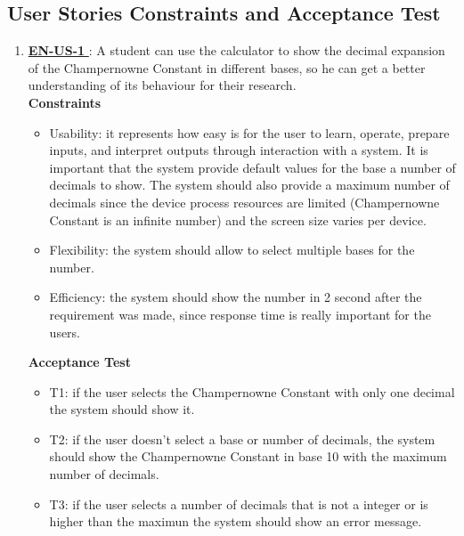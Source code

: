 \documentclass{report}
\begin{document}
\subsection{User Stories Constraints and Acceptance Test} 
\begin{enumerate}
    \item \underline{\textbf{EN-US-1 }}: A student can use the calculator to show the decimal expansion of the Champernowne Constant in different bases, so he can get a better understanding of its behaviour for their research. \\ \newline
\textbf{Constraints}
\begin{itemize}
    \item Usability: it represents how easy is for the user to learn, operate, prepare inputs, and interpret outputs through interaction with a system. It is important that the system provide default values for the base a number of decimals to show. The system should also provide a maximum number of decimals since the device process resources are limited (Champernowne Constant is an infinite number) and the screen size varies per device. 
    \item Flexibility: the system should allow to select multiple bases for the number. 
    \item Efficiency: the system should show the number in 2 second after the requirement was made, since response time is really important for the users. \\ \newline
\end{itemize}

\textbf{Acceptance Test}
\begin{itemize}
    \item T1: if the user selects the Champernowne Constant with only one decimal the system should show it.  
    \item T2: if the user doesn't select a base or number of decimals, the system should show the Champernowne Constant in base 10 with the maximum number of decimals.
    \item T3: if the user selects a number of decimals that is not a integer or is higher than the maximun the system should show an error message.\newline
\end{itemize}


\end{enumerate}
\end{document}
